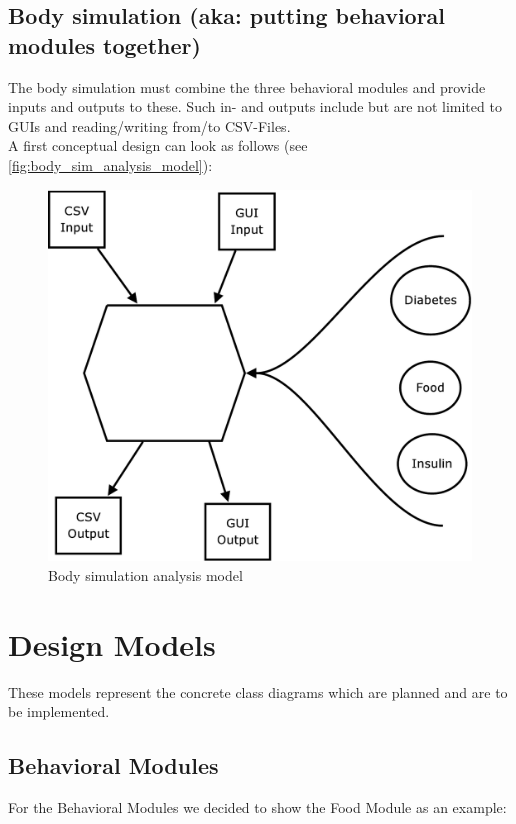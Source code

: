 \documentclass[pdflatex,a4paper,11pt,english]{scrreprt}
\begin{document}
\newpage
\subsection{Body simulation (aka: putting behavioral modules together)}
The body simulation must combine the three behavioral modules and provide
inputs and outputs to these.
Such in- and outputs include but are not limited to GUIs and reading/writing
from/to CSV-Files. \\
A first conceptual design can look as follows (see
\vref{fig:body_sim_analysis_model}):

\begin{figure}[htb]
\centering
\includegraphics[scale=0.4]{images/Body_Simulation_analysis_model}
\caption{Body simulation analysis model}
\label{fig:body_sim_analysis_model}
\end{figure}

\newpage
\section{Design Models}
These models represent the concrete class diagrams which are planned and are to
be implemented. 

\subsection{Behavioral Modules}
For the Behavioral Modules we decided to show the Food Module as an example:
\end{document}

